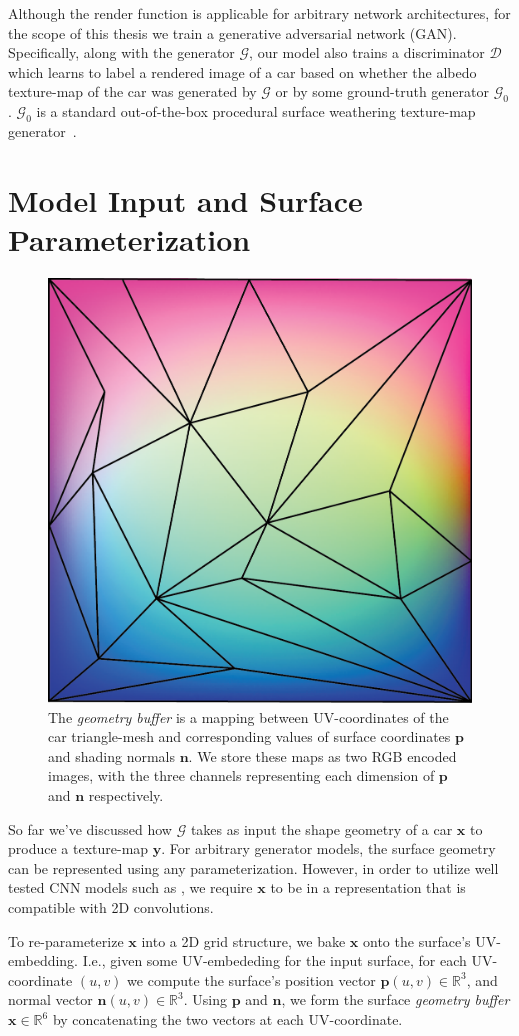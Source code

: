 Although the render function is applicable for arbitrary network architectures, for the
scope of this thesis we train a generative adversarial network (GAN). Specifically, along with the generator $\mathcal{G}$,
our model also trains a discriminator $\mathcal{D}$ which learns to label a rendered image
of a car based on whether the albedo texture-map of the car was generated by $\mathcal{G}$
or by some ground-truth generator $\mathcal{G}_0$. $\mathcal{G}_0$ is a standard out-of-the-box
procedural surface weathering texture-map generator~\cite{bhandari2018procedural}.

\section{Model Input and Surface Parameterization}

\begin{figure}[ht]
    \centering
    \caption{The \emph{geometry buffer} is a mapping between UV-coordinates of the car
        triangle-mesh and     corresponding values of surface coordinates $\mathbf{p}$ and
        shading normals $\mathbf{n}$. We store these maps     as two RGB encoded images, with
        the three channels representing each dimension of $\mathbf{p}$ and $\mathbf{n}$
        respectively.}
    \label{fig:gbuffer}
    \vspace{0.2in}
    \includegraphics[width=.3\linewidth]{graphics/gbuffer.png}
\end{figure}

So far we've discussed how $\mathcal{G}$ takes as input the shape geometry of a car
$\mathbf{x}$ to produce a texture-map $\mathbf{y}$. For arbitrary generator models, the
surface geometry can be represented using any parameterization. However, in order to utilize
well tested CNN models such as \cite{johnson2016perceptual}, we require $\mathbf{x}$ to be in a
representation that is compatible with 2D convolutions.

To re-parameterize $\mathbf{x}$ into a 2D grid structure, we bake $\mathbf{x}$ onto the surface's
UV-embedding. I.e., given some UV-embededing for the input surface, for each UV-coordinate
$(u, v)$ we compute the surface's position vector $\mathbf{p}(u, v) \in \mathbb{R}^3$, and normal
vector $\mathbf{n}(u, v) \in \mathbb{R}^3$. Using $\mathbf{p}$ and $\mathbf{n}$, we form the
surface \emph{geometry buffer} $\mathbf{x} \in \mathbb{R}^6$ by concatenating the two vectors at
each UV-coordinate.

